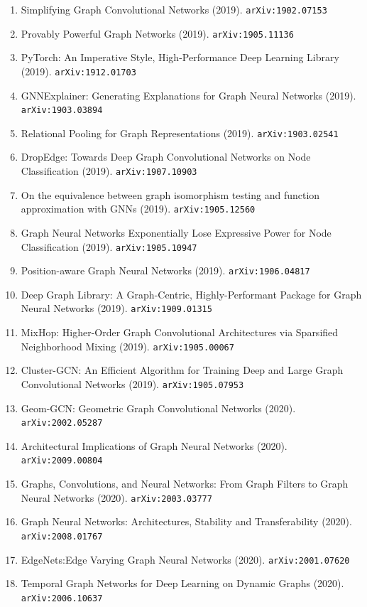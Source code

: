 \documentclass[11pt]{article}
\begin{document}
\begin{enumerate}
  \item Simplifying Graph Convolutional Networks (2019). \texttt{arXiv:1902.07153}
  \item Provably Powerful Graph Networks (2019). \texttt{arXiv:1905.11136}
  \item PyTorch: An Imperative Style, High-Performance Deep Learning Library (2019). \texttt{arXiv:1912.01703}
  \item GNNExplainer: Generating Explanations for Graph Neural Networks (2019). \texttt{arXiv:1903.03894}
  \item Relational Pooling for Graph Representations (2019). \texttt{arXiv:1903.02541}
  \item DropEdge: Towards Deep Graph Convolutional Networks on Node
  Classification (2019). \texttt{arXiv:1907.10903}
  \item On the equivalence between graph isomorphism testing and function
  approximation with GNNs (2019). \texttt{arXiv:1905.12560}
  \item Graph Neural Networks Exponentially Lose Expressive Power for Node
  Classification (2019). \texttt{arXiv:1905.10947}
  \item Position-aware Graph Neural Networks (2019). \texttt{arXiv:1906.04817}
  \item Deep Graph Library: A Graph-Centric, Highly-Performant Package for Graph
  Neural Networks (2019). \texttt{arXiv:1909.01315}
  \item MixHop: Higher-Order Graph Convolutional Architectures via Sparsified
  Neighborhood Mixing (2019). \texttt{arXiv:1905.00067}
  \item Cluster-GCN: An Efficient Algorithm for Training Deep and Large Graph
  Convolutional Networks (2019). \texttt{arXiv:1905.07953}
  \item Geom-GCN: Geometric Graph Convolutional Networks (2020). \texttt{arXiv:2002.05287}
  \item Architectural Implications of Graph Neural Networks (2020). \texttt{arXiv:2009.00804}
  \item Graphs, Convolutions, and Neural Networks: From Graph Filters to Graph
  Neural Networks (2020). \texttt{arXiv:2003.03777}
  \item Graph Neural Networks: Architectures, Stability and Transferability (2020). \texttt{arXiv:2008.01767}
  \item EdgeNets:Edge Varying Graph Neural Networks (2020). \texttt{arXiv:2001.07620}
  \item Temporal Graph Networks for Deep Learning on Dynamic Graphs (2020). \texttt{arXiv:2006.10637}

\end{enumerate}
\end{document}
